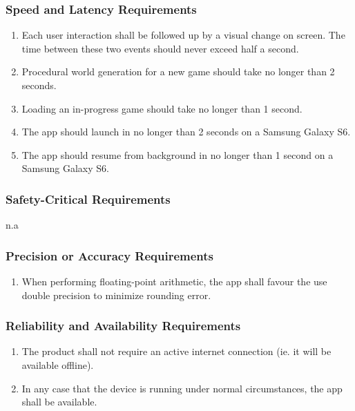 \documentclass[]{article}
\begin{document}
\subsubsection{Speed and Latency Requirements}
\label{ssub:speed_and_latency_requirements}
\begin{enumerate}[{PR}1. ]
	\item Each user interaction shall be followed up by a visual change on screen. The time between these two events should never exceed half a second.
	\item Procedural world generation for a new game should take no longer than 2 seconds.
	\item Loading an in-progress game should take no longer than 1 second.
	\item The app should launch in no longer than 2 seconds on a Samsung Galaxy S6.
	\item The app should resume from background in no longer than 1 second on a Samsung Galaxy S6.
	\holdEnum
\end{enumerate}

\subsubsection{Safety-Critical Requirements}
\label{ssub:safety_critical_requirements}
n.a

\subsubsection{Precision or Accuracy Requirements}
\label{ssub:precision_or_accuracy_requirements}
\begin{enumerate}[{PR}1. ]
	\resumeEnum
	\item When performing floating-point arithmetic, the app shall favour the use double precision to minimize rounding error.
	\holdEnum
\end{enumerate}

\subsubsection{Reliability and Availability Requirements}
\label{ssub:reliability_and_availability_requirements}
\begin{enumerate}[{PR}1. ]
	\resumeEnum
	\item The product shall not require an active internet connection (ie. it will be available offline).
	\item In any case that the device is running under normal circumstances, the app shall be available.
	\holdEnum
\end{enumerate}
\end{document}

